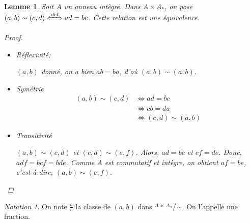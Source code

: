 \documentclass{report}
\newtheorem*{lem}{Lemme}
\theoremstyle{definition}
\theoremstyle{remark}
\newtheorem*{nota}{Notation}
\begin{document}
	\begin{lem}
		Soit $A$ un anneau int\`egre. Dans $A\times A_*$, on pose $(a,b) \sim (c,d) \xLeftrightarrow{\operatorname{def}} ad=bc$. Cette relation est une \'equivalence.
		\begin{proof}~

			\begin{itemize}
				\item R\'eflexivit\'e:

				$(a,b)$ donn\'e, on a bien $ab=ba$, d'o\`u $(a,b) \sim (a,b)$.
				\item Sym\'etrie
				\begin{align*}
				(a,b) \sim (c,d)&\Leftrightarrow ad=bc\\
				&\Leftrightarrow cb=da\\
				&\Leftrightarrow (c,d) \sim (a,b)
				\end{align*}
				\item Transitivit\'e

				$(a,b) \sim (c,d)$ et $(c,d) \sim (e,f)$. Alors, $ad=bc$ et $cf=de$. Donc, $adf=bcf=bde$. Comme $A$ est commutatif et int\`egre, on obtient $af=be$, c'est-\`a-dire, $(a,b) \sim (e,f)$.
			\end{itemize}
		\end{proof}
	\end{lem}

	\begin{nota}
		On note $\frac{a}{b}$ la classe de $(a,b)$ dans $\sfrac{A\times A_*}{\sim}$. On l'appelle une fraction.
	\end{nota}
\end{document}
